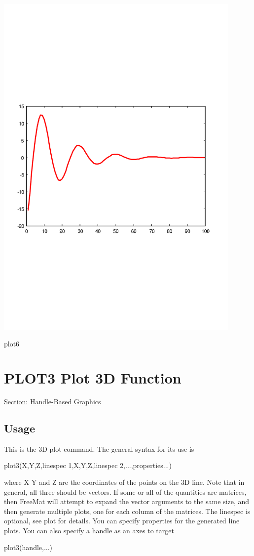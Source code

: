  
\begin{DoxyImage}
\includegraphics[width=12cm]{plot6}
\caption{plot6}
\end{DoxyImage}
 \hypertarget{handle_plot3}{}\section{P\-L\-O\-T3 Plot 3\-D Function}\label{handle_plot3}
Section\-: \hyperlink{sec_handle}{Handle-\/\-Based Graphics} \hypertarget{vtkwidgets_vtkxyplotwidget_Usage}{}\subsection{Usage}\label{vtkwidgets_vtkxyplotwidget_Usage}
This is the 3\-D plot command. The general syntax for its use is \begin{DoxyVerb}  plot3(X,Y,Z,{linespec 1},X,Y,Z,{linespec 2},...,properties...)
\end{DoxyVerb}
 where {\ttfamily X} {\ttfamily Y} and {\ttfamily Z} are the coordinates of the points on the 3\-D line. Note that in general, all three should be vectors. If some or all of the quantities are matrices, then Free\-Mat will attempt to expand the vector arguments to the same size, and then generate multiple plots, one for each column of the matrices. The linespec is optional, see {\ttfamily plot} for details. You can specify {\ttfamily properties} for the generated line plots. You can also specify a handle as an axes to target \begin{DoxyVerb}  plot3(handle,...)
\end{DoxyVerb}
